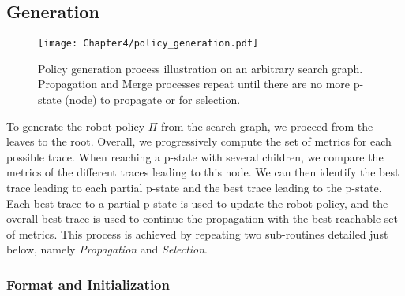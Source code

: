     \subsection{Generation}

\begin{figure}
    \texttt{[image: Chapter4/policy\_generation.pdf]}
    \caption{Policy generation process illustration on an arbitrary search graph. Propagation and Merge processes repeat until there are no more p-state (node) to propagate or for selection.}
    \label{fig:policy_generation}
\end{figure}

To generate the robot policy $\Pi$ from the search graph, we proceed from the leaves to the root. 
Overall, we progressively compute the set of metrics for each possible trace. When reaching a p-state with several children, we compare the metrics of the different traces leading to this node. We can then identify the best trace leading to each partial p-state and the best trace leading to the p-state. Each best trace to a partial p-state is used to update the robot policy, and the overall best trace is used to continue the propagation with the best reachable set of metrics.
This process is achieved by repeating two sub-routines detailed just below, namely \textit{Propagation} and \textit{Selection}. 






    \subsubsection{Format and Initialization}

